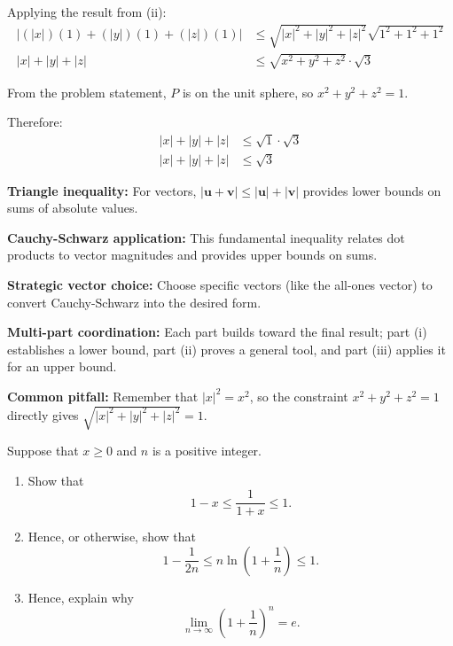 \begin{solution}
Applying the result from (ii):
\begin{align*}
    | (|x|)(1) + (|y|)(1) + (|z|)(1) | &\le \sqrt{|x|^2 + |y|^2 + |z|^2} \sqrt{1^2 + 1^2 + 1^2} \\
    |x| + |y| + |z| &\le \sqrt{x^2 + y^2 + z^2} \cdot \sqrt{3}
\end{align*}

From the problem statement, $P$ is on the unit sphere, so $x^2 + y^2 + z^2 = 1$.

Therefore:
\begin{align*}
    |x| + |y| + |z| &\le \sqrt{1} \cdot \sqrt{3} \\
    |x| + |y| + |z| &\le \sqrt{3}
\end{align*}
\end{solution}

\begin{takeaways}

    \item \textbf{Triangle inequality:} For vectors, $|\mathbf{u} + \mathbf{v}| \le |\mathbf{u}| + |\mathbf{v}|$ provides lower bounds on sums of absolute values.
    \item \textbf{Cauchy-Schwarz application:} This fundamental inequality relates dot products to vector magnitudes and provides upper bounds on sums.
    \item \textbf{Strategic vector choice:} Choose specific vectors (like the all-ones vector) to convert Cauchy-Schwarz into the desired form.
    \item \textbf{Multi-part coordination:} Each part builds toward the final result; part (i) establishes a lower bound, part (ii) proves a general tool, and part (iii) applies it for an upper bound.
    \item \textbf{Common pitfall:} Remember that $|x|^2 = x^2$, so the constraint $x^2 + y^2 + z^2 = 1$ directly gives $\sqrt{|x|^2 + |y|^2 + |z|^2} = 1$.

\end{takeaways}

\begin{problem}
Suppose that $x \geq 0$ and $n$ is a positive integer.
\begin{enumerate}[label=(\roman*)]
    \item Show that
    \[
    1-x \leq \frac{1}{1+x} \leq 1.
    \]

    \item Hence, or otherwise, show that
    \[
    1-\frac{1}{2n} \leq n\ln \left(1+\frac{1}{n}\right) \leq 1.
    \]

    \item Hence, explain why
    \[
    \lim_{n\to\infty} \left(1+\frac{1}{n}\right)^n = e.
    \]
\end{enumerate}
\end{problem}

